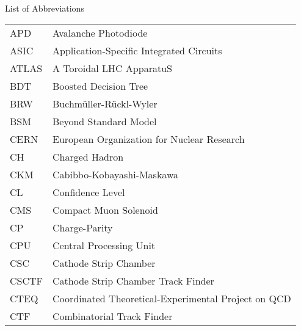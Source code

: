 
\renewcommand{\baselinestretch}{1}
\small\normalsize
\hbox{\ }

\vspace{-4em}

\begin{center}
\large{List of Abbreviations}
\end{center} 

\vspace{3pt}

\begin{longtable}[l]{@{}l@{\ \ \ \ \ \ \ \ \ \ \ \ }l}
APD        & Avalanche Photodiode \\
ASIC       & Application-Specific Integrated Circuits \\
ATLAS      & A Toroidal LHC ApparatuS \\
BDT        & Boosted Decision Tree \\
BRW        & Buchm\"{u}ller-R\"{u}ckl-Wyler \\
BSM        & Beyond Standard Model \\
CERN       & European Organization for Nuclear Research \\
CH         & Charged Hadron \\
CKM        & Cabibbo-Kobayashi-Maskawa \\
CL         & Confidence Level \\
CMS        & Compact Muon Solenoid \\
CP         & Charge-Parity \\
CPU        & Central Processing Unit \\
CSC        & Cathode Strip Chamber \\
CSCTF      & Cathode Strip Chamber Track Finder \\
CTEQ       & Coordinated Theoretical-Experimental Project on QCD \\
CTF        & Combinatorial Track Finder \\

\end{longtable}
